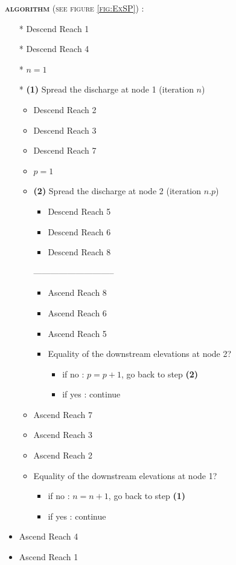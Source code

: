\textsc{\textbf{algorithm} (see figure \ref{fig:ExSP}) :}
\begin{itemize}
 \item[*] Descend Reach 1
 \item[*] Descend Reach 4
 \item[*] $n = 1$
 \item[*] \textbf{(1)} Spread the discharge at node 1 (iteration $n$)
 \begin{itemize}
  \item Descend Reach 2
  \item Descend Reach 3
  \item Descend Reach 7
  \item $p = 1$
  \item \textbf{(2)} Spread the discharge at node 2 (iteration $n.p$)
  \begin{itemize}
   \item Descend Reach 5
   \item Descend Reach 6
   \item Descend Reach 8
  \end{itemize}
  -----------------------------
  \begin{itemize}
   \item Ascend Reach 8
   \item Ascend Reach 6
   \item Ascend Reach 5
   \item Equality of the downstream elevations at node 2?
   \begin{itemize}
    \item if no : $p = p + 1$, go back to step \textbf{(2)}
    \item if yes : continue
   \end{itemize}
  \end{itemize}
  \item Ascend Reach 7
  \item Ascend Reach 3
  \item Ascend Reach 2
  \item Equality of the downstream elevations at node 1?
  \begin{itemize}
    \item if no : $n = n + 1$, go back to step \textbf{(1)}
    \item if yes : continue
   \end{itemize}
  \end{itemize}
 \item Ascend Reach 4
 \item Ascend Reach 1
\end{itemize}

